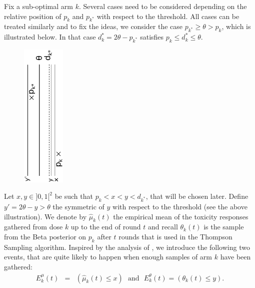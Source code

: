 Fix a sub-optimal arm $k$. Several cases need to be considered depending on the relative position of $p_k$ and $p_{k^*}$ with respect to the threshold. All cases can be treated similarly and to fix the ideas, we consider the case $p_{k^*} \geq \theta > p_k$, which is illustrated below. In that case $d^*_k = 2\theta - p_{k^*}$ satisfies $p_k \leq d_{k}^* \leq \theta$.

\begin{figure}[h]\centering
 \includegraphics[height=7cm,angle=-90]{dosefinding/illustration}
\end{figure}

Let $x,y \in ]0,1[^2$ be such that $p_k < x < y < d_{k^*}$, that will be chosen later. Define $y' = 2\theta - y > \theta$ the symmetric of $y$ with respect to the threshold (see the above illustration). We denote by  $\hat{\mu}_k(t)$ the empirical mean of the toxicity responses gathered from dose $k$ up to the end of round $t$ and recall $\theta_k(t)$ is the sample from the Beta posterior on $p_k$ after $t$ rounds that is used in the Thompson Sampling algorithm. Inspired by the analysis of \cite{AGAISTAT13}, we introduce the following two events, that are quite likely to happen when enough samples of arm $k$ have been gathered: 
\begin{eqnarray*}
 E_k^\mu (t) & = & \left(\hat{\mu}_k(t) \leq x\right) \ \ \ \text{and} \ \ \ E_k^\theta (t)  =  \left({\theta}_k(t) \leq y\right).
\end{eqnarray*}

